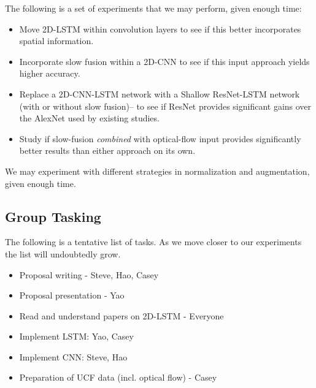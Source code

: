 The following is a set of experiments that we may perform, given enough time:
\begin{itemize}
\item Move 2D-LSTM within convolution layers to see if this better incorporates spatial information.
\item Incorporate slow fusion within a 2D-CNN to see if this input approach yields higher accuracy.
\item Replace a 2D-CNN-LSTM network with a Shallow ResNet-LSTM network (with or without slow fusion)-- to see if ResNet provides significant gains over the AlexNet used by existing studies.
\item Study if slow-fusion \emph{combined} with optical-flow input provides significantly better results than either approach on its own.
\end{itemize}
We may experiment with different strategies in normalization and augmentation, given enough time.
\subsection*{Group Tasking}
The following is a tentative list of tasks. As we move closer to our experiments the list will undoubtedly grow. 
\begin{itemize}
\item Proposal writing - Steve, Hao, Casey
\item Proposal presentation - Yao
\item Read and understand papers on 2D-LSTM - Everyone
\item Implement LSTM: Yao, Casey
\item Implement CNN: Steve, Hao
\item Preparation of UCF data (incl. optical flow) - Casey
\end{itemize}
